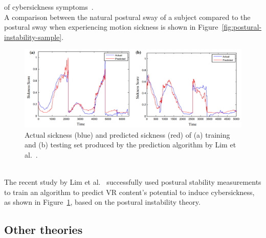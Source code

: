 of cybersickness symptoms~\cite{Lim2020}.
\\
A comparison between the natural postural sway of a subject compared to the postural sway when experiencing motion
sickness is shown in Figure~\ref{fig:postural-instability-sample}.
\begin{figure}[h]
    \centering
    \includegraphics[width=\textwidth]{content/2_related_work/img/PosturalStabilitySicknessPrediction[Lim2020]}
    \caption{Actual sickness (blue) and predicted sickness (red) of (a) training and (b) testing set produced by the
    prediction algorithm by Lim et al.~\cite{Lim2020}.}
    \label{fig:sickness-prediction-algorithm}
\end{figure}
\\
The recent study by Lim et al.~\cite{Lim2020} successfully used postural stability measurements to train an algorithm
to predict VR content's potential to induce cybersickness, as shown in Figure~\ref{fig:sickness-prediction-algorithm},
based on the postural instability theory.


\subsection{Other theories}\label{subsec:other-theories}

